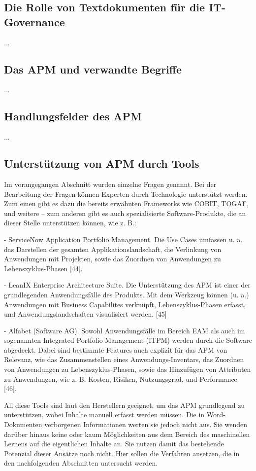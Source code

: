 \subsection{Die Rolle von Textdokumenten für die IT-Governance}
... 

\subsection {Das APM und verwandte Begriffe}
...

\subsection {Handlungsfelder des APM}
...

\subsection{Unterstützung von APM durch Tools}
Im vorangegangen Abschnitt wurden einzelne Fragen genannt. Bei der Bearbeitung der Fragen können  Experten durch Technologie unterstützt werden. Zum einen gibt es dazu die bereits erwähnten Frameworks wie COBIT, TOGAF, und weitere – zum anderen gibt es auch spezialisierte Software-Produkte, die an dieser Stelle unterstützen können, wie z. B.:

- ServiceNow Application Portfolio Management. Die Use Cases umfassen u. a. das Darstellen der gesamten Applikationslandschaft, die Verlinkung von Anwendungen mit Projekten, sowie das Zuordnen von Anwendungen zu Lebenszyklus-Phasen [44].

- LeanIX Enterprise Architecture Suite. Die Unterstützung des APM ist einer der grundlegenden Anwendungsfälle des Produkts. Mit dem Werkzeug können (u. a.) Anwendungen mit Business Capabilites verknüpft, Lebenszyklus-Phasen erfasst, und Anwendungslandschaften visualisiert werden. [45]

- Alfabet (Software AG). Sowohl Anwendungsfälle im Bereich EAM als auch im sogenannten Integrated Portfolio Management (ITPM) werden durch die Software abgedeckt. Dabei sind bestimmte Features auch explizit für das APM von Relevanz, wie das Zusammenstellen eines Anwendungs-Inventars, das Zuordnen von Anwendungen zu Lebenszyklus-Phasen, sowie das Hinzufügen von Attributen zu Anwendungen, wie z. B. Kosten, Risiken, Nutzungsgrad, und Performance [46]. 

All diese Tools sind laut den Herstellern geeignet, um das APM grundlegend zu unterstützen, wobei Inhalte manuell erfasst werden müssen. Die in Word-Dokumenten verborgenen Informationen werten sie jedoch nicht aus. Sie wenden darüber hinaus keine oder kaum Möglichkeiten aus dem Bereich des maschinellen Lernens auf die eigentlichen Inhalte an. Sie nutzen damit das bestehende Potenzial dieser Ansätze noch nicht. Hier sollen die Verfahren ansetzen, die in den nachfolgenden Abschnitten untersucht werden.

